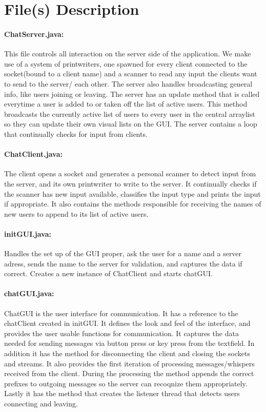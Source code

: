 \documentclass[12pt, a4paper]{article}
\begin{document}
\section{File(s) Description}
\paragraph{ChatServer.java:}
This file controls all interaction on the server side of the application. We make use of a system of printwriters, one spawned for every client connected to the socket(bound to a client name) and a scanner to read any input the clients want to send to the server/ each other. The server also handles broadcasting general info, like users joining or leaving. The server has an update method that is called everytime a user is added to or taken off the list of active users. This method broadcasts the currently active list of users to every user in the central arraylist so they can update their own visual lists on the GUI. The server contains a loop that continually checks for input from clients.

\paragraph{ChatClient.java:}
The client opens a socket and generates a personal scanner to detect input from the server, and its own printwriter to write to the server. It continually checks if the scanner has new input available, classifies the input type and prints the input if appropriate. It also contains the methods responsible for receiving the names of new users to append to its list of active users.

\paragraph{initGUI.java:}
Handles the set up of the GUI proper, ask the user for a name and a server adress, sends the name to the server for validation, and captures the data if correct. Creates a new instance of ChatClient and starts chatGUI.

\paragraph{chatGUI.java:}
ChatGUI is the user interface for communication. It has a reference to the chatClient created in initGUI. It defines the look and feel of the interface, and provides the user usable functions for communication. It captures the data needed for sending messages via button press or key press from the textfield. In addition it has the method for disconnecting the client and closing the sockets and streams.
It also provides the first iteration of processing messages/whispers received from the client. During the processing the method appends the correct prefixes to outgoing messages so the server can recoqnize them appropriately.
Lastly it has the method that creates the listener thread that detects users connecting and leaving.
\end{document}
